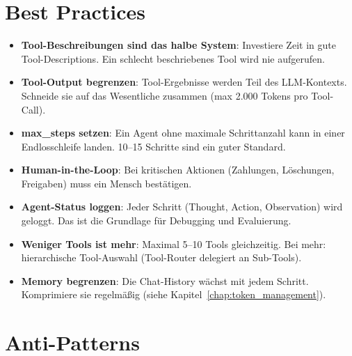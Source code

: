 \section{Best Practices}

\begin{itemize}[leftmargin=*]
    \item \textbf{Tool-Beschreibungen sind das halbe System}: Investiere Zeit in gute Tool-Descriptions. Ein schlecht beschriebenes Tool wird nie aufgerufen.
    \item \textbf{Tool-Output begrenzen}: Tool-Ergebnisse werden Teil des LLM-Kontexts. Schneide sie auf das Wesentliche zusammen (max 2.000 Tokens pro Tool-Call).
    \item \textbf{max\_steps setzen}: Ein Agent ohne maximale Schrittanzahl kann in einer Endlosschleife landen. 10--15 Schritte sind ein guter Standard.
    \item \textbf{Human-in-the-Loop}: Bei kritischen Aktionen (Zahlungen, Löschungen, Freigaben) muss ein Mensch bestätigen.
    \item \textbf{Agent-Status loggen}: Jeder Schritt (Thought, Action, Observation) wird geloggt. Das ist die Grundlage für Debugging und Evaluierung.
    \item \textbf{Weniger Tools ist mehr}: Maximal 5--10 Tools gleichzeitig. Bei mehr: hierarchische Tool-Auswahl (Tool-Router delegiert an Sub-Tools).
    \item \textbf{Memory begrenzen}: Die Chat-History wächst mit jedem Schritt. Komprimiere sie regelmäßig (siehe Kapitel~\ref{chap:token_management}).
\end{itemize}

\section{Anti-Patterns}

